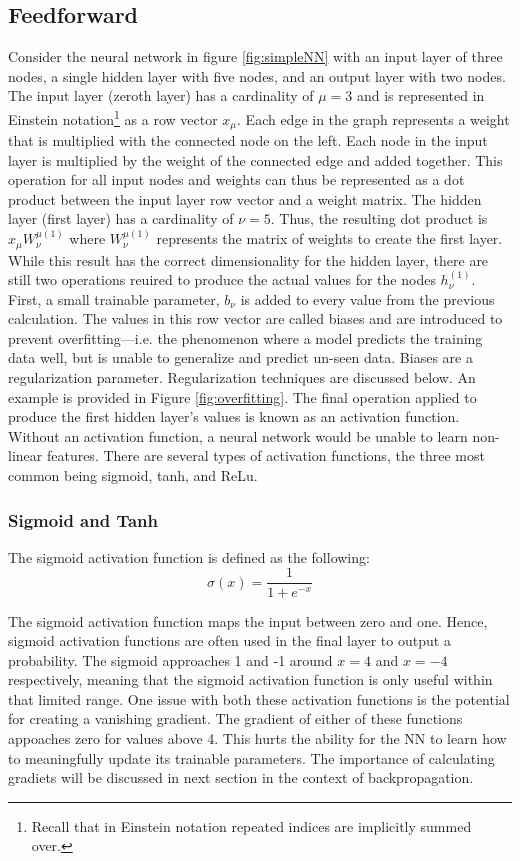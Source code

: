 \subsection{Feedforward}
Consider the neural network in figure \ref{fig:simpleNN} with an input layer of three nodes, a single hidden layer with five nodes, and an output layer with two nodes. The input layer (zeroth layer) has a cardinality of $ \mu=3 $ and is represented in Einstein notation\footnote{Recall that in Einstein notation repeated indices are implicitly summed over.} as a row vector $ x_\mu $. Each edge in the graph represents a weight that is multiplied with the connected node on the left. Each node in the input layer is multiplied by the weight of the connected edge and added together. This operation for all input nodes and weights can thus be represented as a dot product between the input layer row vector and a weight matrix. The hidden layer (first layer) has a cardinality of $ \nu=5 $. Thus, the resulting dot product is $ x_\mu W_\nu^{\mu(1)} $ where $ W_\nu^{\mu(1)} $ represents the matrix of weights to create the first layer. While this result has the correct dimensionality for the hidden layer, there are still two operations reuired to produce the actual values for the nodes $ h_\nu^{(1)} $. First, a small trainable parameter, $ b_\nu $  is added to every value from the previous calculation. The values in this row vector are called biases and are introduced to prevent overfitting---i.e. the phenomenon where a model predicts the training data well, but is unable to generalize and predict un-seen data. Biases are a regularization parameter. Regularization techniques are discussed below. An example is provided in Figure \ref{fig:overfitting}. The final operation applied to produce the first hidden layer's values is known as an activation function. Without an activation function, a neural network would be unable to learn non-linear features. There are several types of activation functions, the three most common being sigmoid, tanh, and ReLu.


\subsubsection{Sigmoid and Tanh}
The sigmoid activation function is defined as the following:
\begin{equation}
    \label{sigmoid}
    \sigma (x) = \frac{1}{1 + e^{-x}}
\end{equation}

The sigmoid activation function maps the input between zero and one. Hence, sigmoid activation functions are often used in the final layer to output a probability. The sigmoid approaches 1 and -1 around $ x=4 $ and $ x=-4 $ respectively, meaning that the sigmoid activation function is only useful within that limited range. One issue with both these activation functions is the potential for creating a vanishing gradient. The gradient of either of these functions appoaches zero for values above 4. This hurts the ability for the NN to learn how to meaningfully update its trainable parameters. The importance of calculating gradiets will be discussed in next section in the context of backpropagation. 

